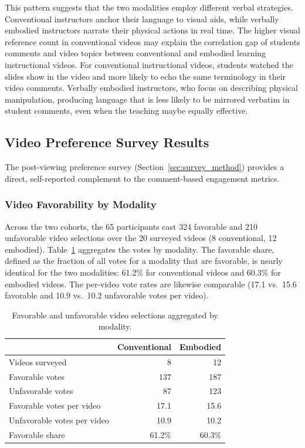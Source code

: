 This pattern suggests that the two modalities employ different verbal strategies. Conventional instructors anchor their language to visual aids, while verbally embodied instructors narrate their physical actions in real time. The higher visual reference count in conventional videos may explain the correlation gap of students comments and video topics between conventional and embodied learning instructional videos. For conventional instructional videos, students watched the slides show in the video and more likely to echo the same terminology in their video comments. Verbally embodied instructors, who focus on describing physical manipulation, producing language that is less likely to be mirrored verbatim in student comments, even when the teaching maybe equally effective.


\subsection{Video Preference Survey Results}
\label{sec:survey_results}

The post-viewing preference survey (Section~\ref{sec:survey_method}) provides a direct, self-reported complement to the comment-based engagement metrics.

\subsubsection{Video Favorability by Modality}
Across the two cohorts, the 65 participants cast 324 favorable and 210 unfavorable video selections over the 20 surveyed videos (8 conventional, 12 embodied). Table~\ref{tab:survey_votes} aggregates the votes by modality. The favorable share, defined as the fraction of all votes for a modality that are favorable, is nearly identical for the two modalities: 61.2\% for conventional videos and 60.3\% for embodied videos. The per-video vote rates are likewise comparable (17.1 vs.\ 15.6 favorable and 10.9 vs.\ 10.2 unfavorable votes per video).

\begin{table}[h!]
    \centering
    \caption{Favorable and unfavorable video selections aggregated by modality.}
    \begin{tabular}{l r r}
        \toprule
        & \textbf{Conventional} & \textbf{Embodied} \\
        \midrule
        Videos surveyed & 8 & 12 \\
        Favorable votes & 137 & 187 \\
        Unfavorable votes & 87 & 123 \\
        Favorable votes per video & 17.1 & 15.6 \\
        Unfavorable votes per video & 10.9 & 10.2 \\
        Favorable share & 61.2\% & 60.3\% \\
        \bottomrule
    \end{tabular}
    \label{tab:survey_votes}
\end{table}

